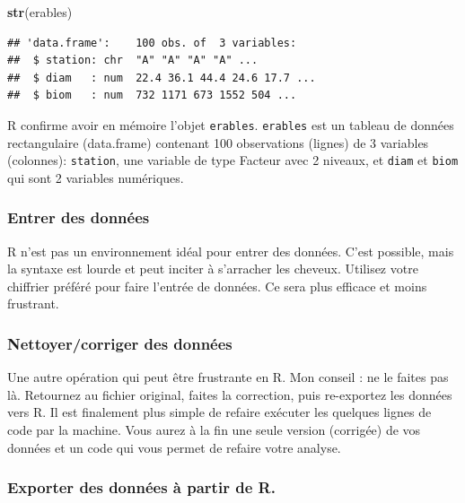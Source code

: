 \documentclass[
  12pt,
]{book}
\newenvironment{Shaded}{\begin{snugshade}}{\end{snugshade}}
\newcommand{\KeywordTok}[1]{\textcolor[rgb]{0.13,0.29,0.53}{\textbf{#1}}}
\newcommand{\NormalTok}[1]{#1}
\begin{document}
\begin{Shaded}
\begin{Highlighting}[]
\KeywordTok{str}\NormalTok{(erables)}
\end{Highlighting}
\end{Shaded}

\begin{verbatim}
## 'data.frame':    100 obs. of  3 variables:
##  $ station: chr  "A" "A" "A" "A" ...
##  $ diam   : num  22.4 36.1 44.4 24.6 17.7 ...
##  $ biom   : num  732 1171 673 1552 504 ...
\end{verbatim}

R confirme avoir en mémoire l'objet \texttt{erables}.
\texttt{erables} est un tableau de données rectangulaire (data.frame) contenant 100 observations (lignes) de 3 variables (colonnes): \texttt{station}, une variable de type Facteur avec 2 niveaux, et \texttt{diam} et \texttt{biom} qui sont 2 variables numériques.

\hypertarget{entrer-des-donnuxe9es}{%
\subsubsection{Entrer des données}\label{entrer-des-donnuxe9es}}

R n'est pas un environnement idéal pour entrer des données.
C'est possible, mais la syntaxe est lourde et peut inciter à s'arracher les cheveux.
Utilisez votre chiffrier préféré pour faire l'entrée de données.
Ce sera plus efficace et moins frustrant.

\hypertarget{nettoyercorriger-des-donnuxe9es}{%
\subsubsection{Nettoyer/corriger des données}\label{nettoyercorriger-des-donnuxe9es}}

Une autre opération qui peut être frustrante en R.
Mon conseil : ne le faites pas là.
Retournez au fichier original, faites la correction, puis re-exportez les données vers R.
Il est finalement plus simple de refaire exécuter les quelques lignes de code par la machine.
Vous aurez à la fin une seule version (corrigée) de vos données et un code qui vous permet de refaire votre analyse.

\hypertarget{exporter-des-donnuxe9es-uxe0-partir-de-r.}{%
\subsubsection{Exporter des données à partir de R.}\label{exporter-des-donnuxe9es-uxe0-partir-de-r.}}
\end{document}
